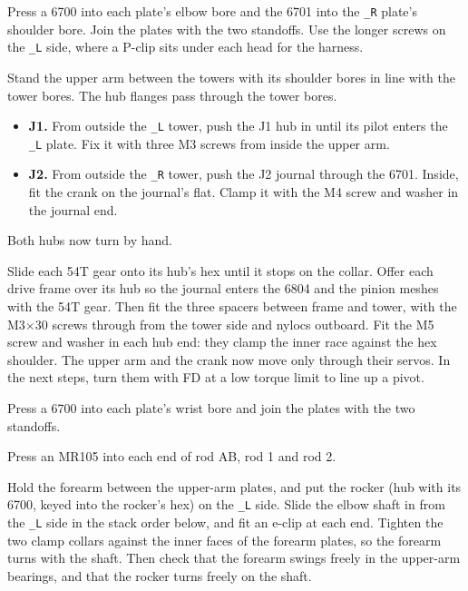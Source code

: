 \documentclass[10pt]{article}
\begin{document}
Press a 6700 into each plate's elbow bore and the 6701 into the \texttt{\_R} plate's shoulder bore. Join the plates with the
two standoffs. Use the longer screws on the \texttt{\_L} side, where a P-clip sits under each head for the harness.
\steplater

Stand the upper arm between the towers with its shoulder bores in line with the tower bores. The hub flanges pass
through the tower bores.
\begin{itemize}\itemsep0pt
  \item \textbf{J1.} From outside the \texttt{\_L} tower, push the J1 hub in until its pilot enters the \texttt{\_L} plate.
  Fix it with three M3 screws from inside the upper arm.
  \item \textbf{J2.} From outside the \texttt{\_R} tower, push the J2 journal through the 6701. Inside, fit the crank on
  the journal's flat. Clamp it with the M4 screw and washer in the journal end.
\end{itemize}
Both hubs now turn by hand.
\steplater

Slide each 54T gear onto its hub's hex until it stops on the collar. Offer each drive
frame over its hub so the journal enters the 6804 and the pinion meshes with the 54T gear. Then fit the three spacers
between frame and tower, with the M3$\times$30 screws through from the tower side and nylocs outboard. Fit the M5 screw and
washer in each hub end: they clamp the inner race against the hex shoulder. The upper arm and the crank now move only
through their servos. In the next steps, turn them with FD at a low torque limit to line up a pivot.
\steplater

Press a 6700 into each plate's wrist bore and join the plates with the two standoffs.
\steplater

Press an MR105 into each end of rod AB, rod 1 and rod 2.
\steplater

Hold the forearm between the upper-arm plates, and put the rocker (hub with its 6700, keyed into the rocker's hex) on
the \texttt{\_L} side. Slide the elbow shaft in from the \texttt{\_L} side in the stack order below, and fit an e-clip
at each end. Tighten the two clamp collars against the inner faces of the forearm plates, so the forearm turns with the
shaft. Then check that the forearm swings freely in the upper-arm bearings, and that the rocker turns freely on the shaft.
\steplater
\end{document}
